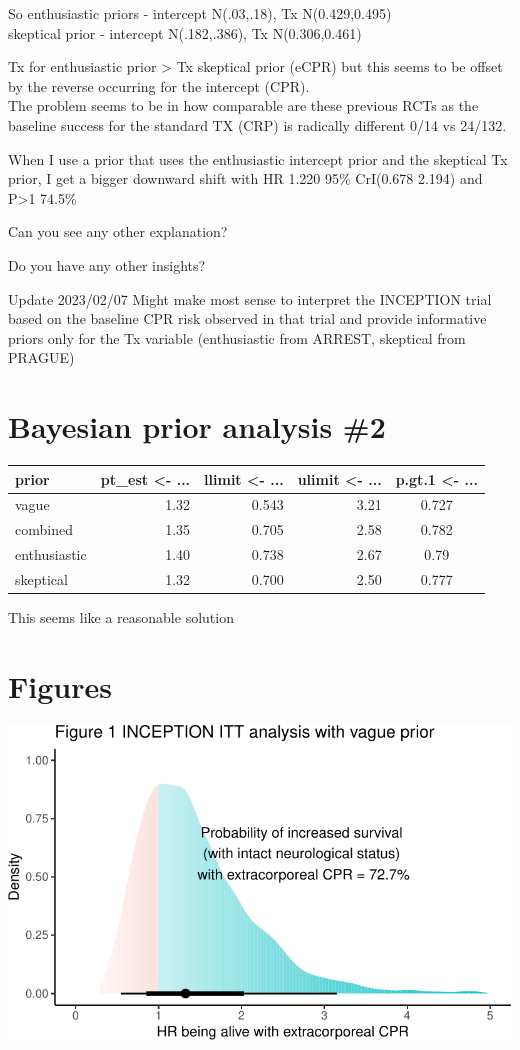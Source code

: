 \documentclass[
  super,
  preprint,
  3p]{elsarticle}
\begin{document}
So enthusiastic priors - intercept N(.03,.18), Tx N(0.429,0.495)\\
skeptical prior - intercept N(.182,.386), Tx N(0.306,0.461)

Tx for enthusiastic prior \textgreater{} Tx skeptical prior (eCPR) but
this seems to be offset by the reverse occurring for the intercept
(CPR).\\
The problem seems to be in how comparable are these previous RCTs as the
baseline success for the standard TX (CRP) is radically different 0/14
vs 24/132.

When I use a prior that uses the enthusiastic intercept prior and the
skeptical Tx prior, I get a bigger downward shift with HR 1.220 95\%
CrI(0.678 2.194) and P\textgreater1 74.5\%

Can you see any other explanation?

Do you have any other insights?

Update 2023/02/07 Might make most sense to interpret the INCEPTION trial
based on the baseline CPR risk observed in that trial and provide
informative priors only for the Tx variable (enthusiastic from ARREST,
skeptical from PRAGUE)

\hypertarget{bayesian-prior-analysis-2}{%
\section{Bayesian prior analysis \#2}\label{bayesian-prior-analysis-2}}

\begin{longtable}{lrrrc}
\toprule
prior & pt\_est <- ... & llimit <- ... & ulimit <- ... & p.gt.1 <- ... \\ 
\midrule
vague & 1.32 & 0.543 & 3.21 & 0.727 \\ 
combined & 1.35 & 0.705 & 2.58 & 0.782 \\ 
enthusiastic & 1.40 & 0.738 & 2.67 & 0.79 \\ 
skeptical & 1.32 & 0.700 & 2.50 & 0.777 \\ 
\bottomrule
\end{longtable}

This seems like a reasonable solution

\hypertarget{figures}{%
\section{Figures}\label{figures}}

\includegraphics{manuscript_files/figure-pdf/unnamed-chunk-5-1.pdf}

\newpage


\renewcommand\refname{References}
  
\end{document}
